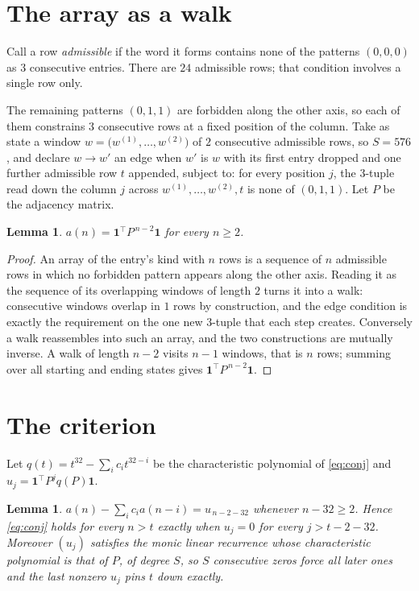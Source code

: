\documentclass[11pt,a4paper]{article}
\theoremstyle{plain}
\newtheorem{lemma}[theorem]{Lemma}
\theoremstyle{definition}
\begin{document}
\section{The array as a walk}

Call a row \emph{admissible} if the word it forms contains none of the patterns
$(0,0,0)$ as $3$ consecutive entries. There are $24$ admissible rows; that condition
involves a single row only.

The remaining patterns $(0,1,1)$ are forbidden along the other axis, so each of them
constrains $3$ consecutive rows at a fixed position of the column. Take as state a
window $w=\bigl(w^{(1)},\dots,w^{(2)}\bigr)$ of $2$ consecutive admissible
rows, so $S=576$, and declare $w\to w'$ an edge when $w'$ is $w$ with its first entry
dropped and one further admissible row $t$ appended, subject to: for every position
$j$, the $3$-tuple read down the column $j$ across $w^{(1)},\dots,w^{(2)},t$
is none of $(0,1,1)$. Let $P$ be the adjacency matrix.

\begin{lemma}\label{lem:walk}
$a(n)=\mathbf{1}^{\!\top}P^{\,n-2}\mathbf{1}$ for every $n\ge2$.
\end{lemma}

\begin{proof}
An array of the entry's kind with $n$ rows is a sequence of $n$ admissible rows in
which no forbidden pattern appears along the other axis. Reading it as the sequence of its
overlapping windows of length $2$ turns it into a walk: consecutive windows overlap in
$1$ rows by construction, and the edge condition is exactly the requirement on the one
new $3$-tuple that each step creates. Conversely a walk reassembles into such an array,
and the two constructions are mutually inverse. A walk of length $n-2$ visits $n-1$
windows, that is $n$ rows; summing over all starting and ending states gives
$\mathbf{1}^{\!\top}P^{\,n-2}\mathbf{1}$.
\end{proof}

\section{The criterion}

Let $q(t)=t^{32}-\sum_i c_i t^{32-i}$ be the characteristic polynomial of
\eqref{eq:conj} and $u_j=\mathbf{1}^{\!\top}P^{j}q(P)\mathbf{1}$.

\begin{lemma}\label{lem:crit}
$a(n)-\sum_i c_i a(n-i)=u_{\,n-2-32}$ whenever $n-32\ge2$. Hence
\eqref{eq:conj} holds for every $n>t$ exactly when $u_j=0$ for every
$j>t-2-32$. Moreover $(u_j)$ satisfies the monic linear recurrence whose
characteristic polynomial is that of $P$, of degree $S$, so $S$ consecutive zeros force all
later ones and the last nonzero $u_j$ pins $t$ down exactly.
\end{lemma}
\end{document}
